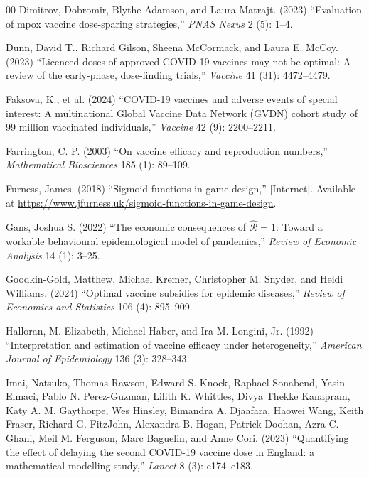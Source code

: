 \documentclass[12pt]{article}
\begin{document}
\begin{thebibliography}{00}
Dimitrov, Dobromir, Blythe Adamson, and Laura Matrajt. (2023)
``Evaluation of mpox vaccine dose-sparing strategies,'' {\em PNAS
  Nexus} 2 (5): 1--4.
  
Dunn, David T., Richard Gilson, Sheena McCormack, and Laura
E. McCoy. (2023) ``Licenced doses of approved COVID-19 vaccines may
not be optimal: A review of the early-phase, dose-finding trials,''
{\em Vaccine} 41 (31): 4472--4479.
  
Faksova, K., et al. (2024) ``COVID-19 vaccines
and adverse events of special interest: A multinational Global Vaccine
Data Network (GVDN) cohort study of 99 million vaccinated
individuals,'' {\em Vaccine} 42 (9): 2200--2211.

Farrington, C. P. (2003) ``On vaccine efficacy and reproduction
numbers,'' {\em Mathematical Biosciences} 185 (1): 89--109.

Furness, James. (2018) ``Sigmoid functions in game design,''
[Internet]. Available at
\url{https://www.jfurness.uk/sigmoid-functions-in-game-design}.

Gans, Joshua S. (2022) ``The economic consequences of
$\hat{\mathcal{R}} = 1$: Toward a workable behavioural epidemiological
model of pandemics,'' {\em Review of Economic Analysis} 14 (1): 3--25.

Goodkin-Gold, Matthew, Michael Kremer, Christopher M. Snyder, and
Heidi Williams. (2024) ``Optimal vaccine subsidies for epidemic
diseases,'' {\em Review of Economics and Statistics} 106 (4):
895--909.

Halloran, M. Elizabeth, Michael Haber, and Ira M. Longini, Jr. (1992)
``Interpretation and estimation of vaccine efficacy under
heterogeneity,'' {\em American Journal of Epidemiology} 136 (3):
328--343.

Imai, Natsuko, Thomas Rawson, Edward S. Knock, Raphael Sonabend, Yasin
Elmaci, Pablo N. Perez-Guzman, Lilith K. Whittles, Divya Thekke
Kanapram, Katy A. M. Gaythorpe, Wes Hinsley, Bimandra A. Djaafara,
Haowei Wang, Keith Fraser, Richard G. FitzJohn, Alexandra B. Hogan,
Patrick Doohan, Azra C. Ghani, Meil M. Ferguson, Marc Baguelin, and
Anne Cori. (2023) ``Quantifying the effect of delaying the second
COVID-19 vaccine dose in England: a mathematical modelling study,''
{\em Lancet} 8 (3): e174--e183.


\end{thebibliography}
\end{document}
